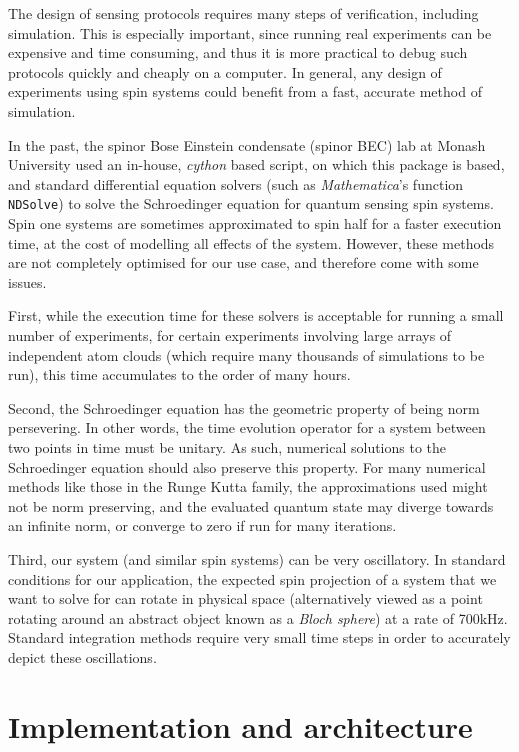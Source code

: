 \documentclass{jors}
\begin{document}
	The design of sensing protocols requires many steps of verification, including simulation. This is especially important, since running real experiments can be expensive and time consuming, and thus it is more practical to debug such protocols quickly and cheaply on a computer. In general, any design of experiments using spin systems could benefit from a fast, accurate method of simulation.

	In the past, the spinor Bose Einstein condensate (spinor BEC) lab at Monash University used an in-house, \emph{cython} based script, on which this package is based, and standard differential equation solvers (such as \emph{Mathematica}'s function \texttt{NDSolve}) to solve the Schroedinger equation for quantum sensing spin systems. Spin one systems are sometimes approximated to spin half for a faster execution time, at the cost of modelling all effects of the system. However, these methods are not completely optimised for our use case, and therefore come with some issues.

	First, while the execution time for these solvers is acceptable for running a small number of experiments, for certain experiments involving large arrays of independent atom clouds (which require many thousands of simulations to be run), this time accumulates to the order of many hours.

	Second, the Schroedinger equation has the geometric property of being norm persevering. In other words, the time evolution operator for a system between two points in time must be unitary. As such, numerical solutions to the Schroedinger equation should also preserve this property. For many numerical methods like those in the Runge Kutta family, the approximations used might not be norm preserving, and the evaluated quantum state may diverge towards an infinite norm, or converge to zero if run for many iterations.

	Third, our system (and similar spin systems) can be very oscillatory. In standard conditions for our application, the expected spin projection of a system that we want to solve for can rotate in physical space (alternatively viewed as a point rotating around an abstract object known as a \emph{Bloch sphere}) at a rate of 700kHz. Standard integration methods require very small time steps in order to accurately depict these oscillations.

\section*{Implementation and architecture}
\end{document}
